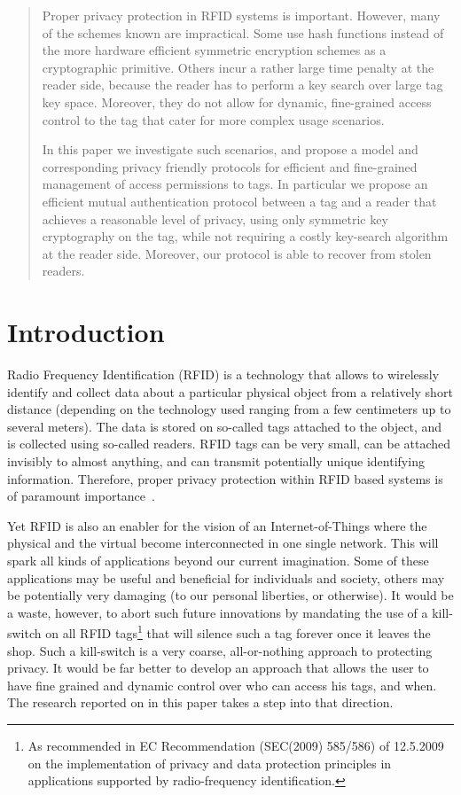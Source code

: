 


\begin{abstract}
Proper privacy protection in RFID systems is important. However, many of the
schemes known are impractical. Some use hash functions instead
of the more hardware efficient symmetric encryption schemes as a 
cryptographic primitive. Others incur a rather large
time penalty at the reader side, because the reader has to perform a 
key search over large tag key space. Moreover, they do not allow for dynamic,
fine-grained access control to the tag that cater for more complex usage
scenarios.

In this paper we investigate such scenarios, and propose a model and
corresponding privacy friendly protocols for efficient and fine-grained
management of access permissions to tags. In particular we propose an
efficient mutual authentication protocol between a tag and a reader that
achieves a reasonable level of privacy, using only symmetric key cryptography
on the tag, while not requiring a costly key-search algorithm at the reader
side. Moreover, our protocol is able to recover from stolen readers.
\end{abstract}

\section{Introduction}

Radio Frequency Identification (RFID) is a technology that allows to wirelessly
identify and collect data about a particular physical object from a
relatively short distance (depending on the technology used ranging from a few
centimeters up to several meters). The data is stored on so-called tags attached to
the object, and is collected using so-called readers. RFID tags can be
very small, can be attached invisibly to almost anything, and can transmit
potentially unique identifying information. Therefore,
proper privacy protection within
RFID based systems is of paramount
importance~\cite{garfinkel2005rfid-privacy,juels2006rfid-secpriv-survey}.

Yet RFID is also an enabler for the vision of an
Inter\-net-of-Things where the physical and the virtual become interconnected in
one single network. This will spark all kinds of applications
beyond our current imagination.
Some of these applications may be useful and
beneficial for individuals and society, others may be potentially very damaging
(to our personal liberties, or otherwise). 
It would be a waste, however, to abort such future innovations by mandating the
use of a kill-switch on all RFID tags\footnote{As recommended in EC Recommendation (SEC(2009) 585/586) of 12.5.2009 on
	the implementation of privacy and 
	data protection principles in applications supported by radio-frequency
	identification.
} 
that will silence such a tag forever once it leaves the shop. Such a
kill-switch is a very coarse, all-or-nothing approach to protecting privacy. 
It would be far better to develop an approach that allows the user to have fine
grained and dynamic control over who can access his tags, and when.
The research reported on in this paper takes a step into that direction.

